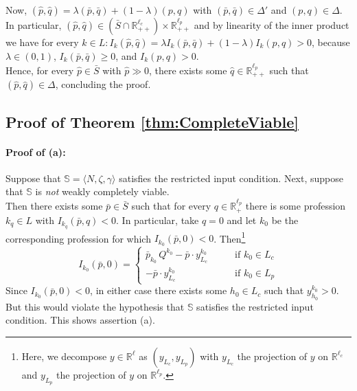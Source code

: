 \documentclass[11pt,fleqn]{article}
\begin{document}
	Now, $( \hat p, \hat q) = \lambda ( \bar p , \bar q) + (1- \lambda ) (p , q)$ with $(\bar p , \bar q ) \in \Delta'$ and $(p , q ) \in \Delta$. In particular, $( \hat p, \hat q) \in (\bar S\cap \mathbb R^{\ell_c}_{++})  \times \mathbb R^{\ell_p}_{++}$ and by linearity of the inner product we have for every $k \in L \colon  I_k ( \hat p, \hat q) = \lambda I_k ( \bar p, \bar q ) + (1- \lambda ) I_k ( p, q ) >0$, because $\lambda \in (0,1)$, $I_k ( \bar p, \bar q ) \geqslant 0$, and $I_k ( p, q ) >0$. \\
	Hence, for every $\hat p \in \bar S$ with $\hat p \gg 0$, there exists some $\hat q \in \mathbb R^{\ell_p}_{++}$ such that $(\hat p, \hat q) \in \Delta$,  concluding the proof.

\subsection{Proof of Theorem \ref{thm:CompleteViable}}\label{sec: app B2}


\paragraph{Proof of (a):}
Suppose that $\mathbb S = \langle N, \zeta , \gamma \rangle$ satisfies the restricted input condition. Next, suppose that $\mathbb S$ is \emph{not} weakly completely viable. \\
Then there exists some $\bar p \in \bar S$ such that for every $q \in \mathbb R^{\ell_p}_+$ there is some profession $k_q \in L$ with $I_{k_q} (\bar p ,q) <0$. In particular, take $q=0$ and let $k_0$ be the corresponding profession for which $I_{k_0} (\bar p, 0) <0$. Then\footnote{Here, we decompose $y \in \mathbb R^\ell$ as $(y_{L_c} , y_{L_p})$ with $y_{L_c}$ the projection of $y$ on $\mathbb R^{\ell_c}$ and $y_{L_p}$ the projection of $y$ on $\mathbb R^{\ell_p}$.}
\[
I_{k_0} (\bar p,0) = \left\{
\begin{array}{ll}
\bar p_{k_0} \, Q^{k_0} - \bar p \cdot y^{k_0}_{L_c} \qquad & \mbox{if } k_0 \in L_c \\
- \bar p \cdot y^{k_0}_{L_c} & \mbox{if } k_0 \in L_p
\end{array}
\right.
\]
Since $I_{k_0} (\bar p, 0) <0$, in either case there exists some $h_0 \in L_c$ such that $y^{k_0}_{h_0} >0$. But this would violate the hypothesis that $\mathbb S$ satisfies the restricted input condition. This shows assertion (a).
\end{document}
